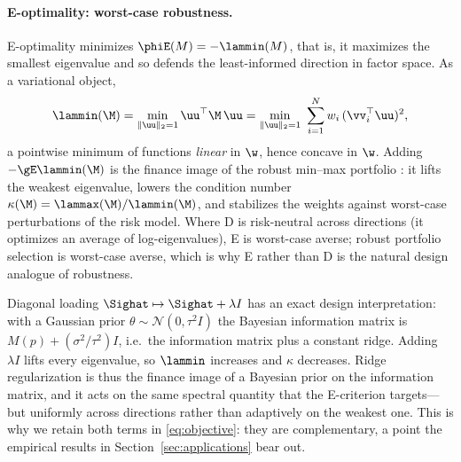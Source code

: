 \paragraph{E-optimality: worst-case robustness.}
E-optimality minimizes $\phiE(M)=-\lammin(M)$, that is, it maximizes the smallest
eigenvalue and so defends the least-informed direction in factor space. As a
variational object,
\begin{equation}
  \lammin(\M)=\min_{\lVert\uu\rVert_2=1}\uu^\top \M\,\uu
  =\min_{\lVert\uu\rVert_2=1}\ \sum_{i=1}^{N}w_i\,(\vv_i^\top\uu)^2 ,
  \label{eq:lammin-var}
\end{equation}
a pointwise minimum of functions \emph{linear} in $\w$, hence concave in $\w$.
Adding $-\gE\lammin(\M)$ is the finance image of the robust min--max portfolio
\cite{goldfarb2003}: it lifts the weakest eigenvalue, lowers the condition number
$\kappa(\M)=\lammax(\M)/\lammin(\M)$, and stabilizes the weights against
worst-case perturbations of the risk model. Where D is risk-neutral across
directions (it optimizes an average of log-eigenvalues), E is worst-case averse;
robust portfolio selection is worst-case averse, which is why E rather than D is
the natural design analogue of robustness.

\begin{remark}
Diagonal loading $\Sighat\mapsto\Sighat+\lambda I$ has an exact design
interpretation: with a Gaussian prior $\theta\sim\mathcal N(0,\tau^2I)$ the
Bayesian information matrix is $M(p)+(\sigma^2/\tau^2)I$, i.e.\ the information
matrix plus a constant ridge. Adding $\lambda I$ lifts every eigenvalue, so
$\lammin$ increases and $\kappa$ decreases. Ridge regularization is thus the
finance image of a Bayesian prior on the information matrix, and it acts on the
same spectral quantity that the E-criterion targets---but uniformly across
directions rather than adaptively on the weakest one. This is why we retain both
terms in \eqref{eq:objective}: they are complementary, a point the empirical
results in Section~\ref{sec:applications} bear out.
\end{remark}

